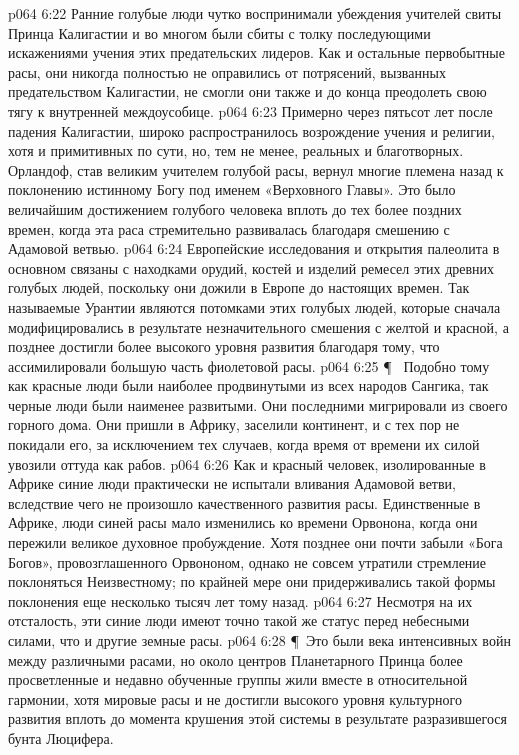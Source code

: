 \vs p064 6:22 Ранние голубые люди чутко воспринимали убеждения учителей свиты Принца Калигастии и во многом были сбиты с толку последующими искажениями учения этих предательских лидеров. Как и остальные первобытные расы, они никогда полностью не оправились от потрясений, вызванных предательством Калигастии, не смогли они также и до конца преодолеть свою тягу к внутренней междоусобице.
\vs p064 6:23 Примерно через пятьсот лет после падения Калигастии, широко распространилось возрождение учения и религии, хотя и примитивных по сути, но, тем не менее, реальных и благотворных. Орландоф, став великим учителем голубой расы, вернул многие племена назад к поклонению истинному Богу под именем «Верховного Главы». Это было величайшим достижением голубого человека вплоть до тех более поздних времен, когда эта раса стремительно развивалась благодаря смешению с Адамовой ветвью.
\vs p064 6:24 Европейские исследования и открытия палеолита в основном связаны с находками орудий, костей и изделий ремесел этих древних голубых людей, поскольку они дожили в Европе до настоящих времен. Так называемые  Урантии являются потомками этих голубых людей, которые сначала модифицировались в результате незначительного смешения с желтой и красной, а позднее достигли более высокого уровня развития благодаря тому, что ассимилировали большую часть фиолетовой расы.
\vs p064 6:25 \P\ \bibnobreakspace {} Подобно тому как красные люди были наиболее продвинутыми из всех народов Сангика, так черные люди были наименее развитыми. Они последними мигрировали из своего горного дома. Они пришли в Африку, заселили континент, и с тех пор не покидали его, за исключением тех случаев, когда время от времени их силой увозили оттуда как рабов.
\vs p064 6:26 Как и красный человек, изолированные в Африке синие люди практически не испытали вливания Адамовой ветви, вследствие чего не произошло качественного развития расы. Единственные в Африке, люди синей расы мало изменились ко времени Орвонона, когда они пережили великое духовное пробуждение. Хотя позднее они почти забыли «Бога Богов», провозглашенного Орвононом, однако не совсем утратили стремление поклоняться Неизвестному; по крайней мере они придерживались такой формы поклонения еще несколько тысяч лет тому назад.
\vs p064 6:27 Несмотря на их отсталость, эти синие люди имеют точно такой же статус перед небесными силами, что и другие земные расы.
\vs p064 6:28 \P\ Это были века интенсивных войн между различными расами, но около центров Планетарного Принца более просветленные и недавно обученные группы жили вместе в относительной гармонии, хотя мировые расы и не достигли высокого уровня культурного развития вплоть до момента крушения этой системы в результате разразившегося бунта Люцифера.
